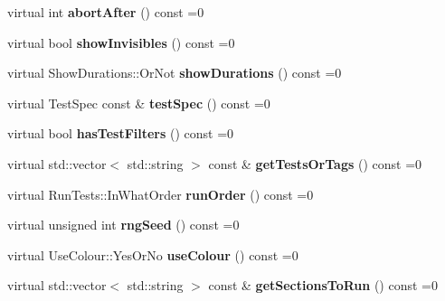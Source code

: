\begin{DoxyCompactItemize}
virtual int {\bfseries abort\+After} () const =0
\item 
\mbox{\label{structCatch_1_1IConfig_aa288bf92ccd0aafd85409d8aefdf738c}} 
virtual bool {\bfseries show\+Invisibles} () const =0
\item 
\mbox{\label{structCatch_1_1IConfig_abaa97d281484278291f0d3db6d404aeb}} 
virtual Show\+Durations\+::\+Or\+Not {\bfseries show\+Durations} () const =0
\item 
\mbox{\label{structCatch_1_1IConfig_a03a2fd8221d896d12bf3684ab2a03588}} 
virtual Test\+Spec const  \& {\bfseries test\+Spec} () const =0
\item 
\mbox{\label{structCatch_1_1IConfig_a49a475bbeb3180c06799d6d958914649}} 
virtual bool {\bfseries has\+Test\+Filters} () const =0
\item 
\mbox{\label{structCatch_1_1IConfig_a1b8a299344a493eb98c12faae48421d7}} 
virtual std\+::vector$<$ std\+::string $>$ const  \& {\bfseries get\+Tests\+Or\+Tags} () const =0
\item 
\mbox{\label{structCatch_1_1IConfig_a0fc59c9aba1d4018538d5526daa5eb78}} 
virtual Run\+Tests\+::\+In\+What\+Order {\bfseries run\+Order} () const =0
\item 
\mbox{\label{structCatch_1_1IConfig_ae049eb45979d841073fa65d1094c7f14}} 
virtual unsigned int {\bfseries rng\+Seed} () const =0
\item 
\mbox{\label{structCatch_1_1IConfig_a87ec19a6b486eb5b5015cf7738fee026}} 
virtual Use\+Colour\+::\+Yes\+Or\+No {\bfseries use\+Colour} () const =0
\item 
\mbox{\label{structCatch_1_1IConfig_afc801995e115557f90e41f3d6e96908d}} 
virtual std\+::vector$<$ std\+::string $>$ const  \& {\bfseries get\+Sections\+To\+Run} () const =0
\item 
\mbox{\label{structCatch_1_1IConfig_a55aff5924bdbb3f558775821b1eb4b3d}} 

\end{DoxyCompactItemize}
